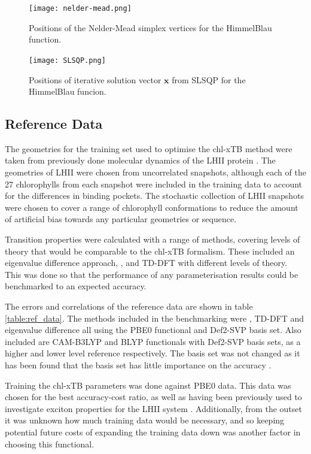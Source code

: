 \begin{figure}
    \texttt{[image: nelder-mead.png]}
    \caption{Positions of the Nelder-Mead simplex vertices for the HimmelBlau function.}
    \label{fig:nelder_mead}
\end{figure}

\begin{figure}
    \texttt{[image: SLSQP.png]}
    \caption{Positions of iterative solution vector $\mathbf{x}$ from SLSQP for
    the HimmelBlau funcion.}
    \label{fig:slsqp}
\end{figure}

\subsection{Reference Data}
\label{subsec:ref_data}
The geometries for the training set used to optimise the chl-xTB method were taken
from previously done molecular dynamics of the LHII protein \cite{Stross2016}. 
The geometries of LHII were chosen from uncorrelated snapshots, although each of
the 27 chlorophylls from each snapshot were included in the training data to account
for the differences in binding pockets. The stochastic collection of LHII snapshots
were chosen to cover a range of chlorophyll conformations to reduce the amount of
artificial bias towards any particular geometries or sequence.

Transition properties were calculated with a range of methods, covering levels of
theory that would be comparable to the chl-xTB formalism. These included an eigenvalue
difference approach, \dscf, and TD-DFT with different levels of theory. This was
done so that the performance of any parameterisation results could be benchmarked
to an expected accuracy.

The errors and correlations of the reference data are shown in table \ref{table:ref_data}.
The methods included  in the benchmarking were \dscf, TD-DFT and eigenvalue difference
all using the PBE0 functional and Def2-SVP basis set. Also included are CAM-B3LYP
and BLYP functionals with Def2-SVP basis sets, as a higher and lower level reference
respectively. The basis set was not changed as it has been found that the basis
set has little importance on the accuracy \cite{Stross2016}.

Training the chl-xTB parameters was done against PBE0 data. This data was chosen
for the best accuracy-cost ratio, as well as having been previously used to investigate
exciton properties for the LHII system \cite{Stross2016}. Additionally, from the
outset it was unknown how much training data would be necessary, and so keeping 
potential future costs of expanding the training data down was another factor in 
choosing this functional.

